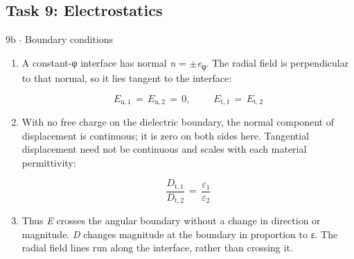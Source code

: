 \documentclass[11pt]{article}
\begin{document}
\begin{keepsection}\subsection{Task 9: Electrostatics}

\begin{workedbox}{9b \ensuremath{\cdot} Boundary conditions}
\begin{enumerate}
\item {}
A constant-φ interface has normal \textit{n} = \ensuremath{\pm}\textit{e}\textsubscript{φ}. The radial field is perpendicular to that normal, so it lies tangent to the interface:

\begin{equation*}{E}_{\mathrm{n},1}\, =\, {E}_{\mathrm{n},2}\, =\, 0,\quad \, \quad \, {E}_{\mathrm{t},1}\, =\, {E}_{\mathrm{t},2}\end{equation*}
\item {}
With no free charge on the dielectric boundary, the normal component of displacement is continuous; it is zero on both sides here. Tangential displacement need not be continuous and scales with each material permittivity:

\begin{equation*}\dfrac{{D}_{\mathrm{t},1}}{{D}_{\mathrm{t},2}}\, =\, \dfrac{ε_{1}}{ε_{2}}\end{equation*}
\item {}
Thus \textit{E} crosses the angular boundary without a change in direction or magnitude. \textit{D} changes magnitude at the boundary in proportion to ε. The radial field lines run along the interface, rather than crossing it.


\end{enumerate}
\end{workedbox}
\end{keepsection}
\end{document}
